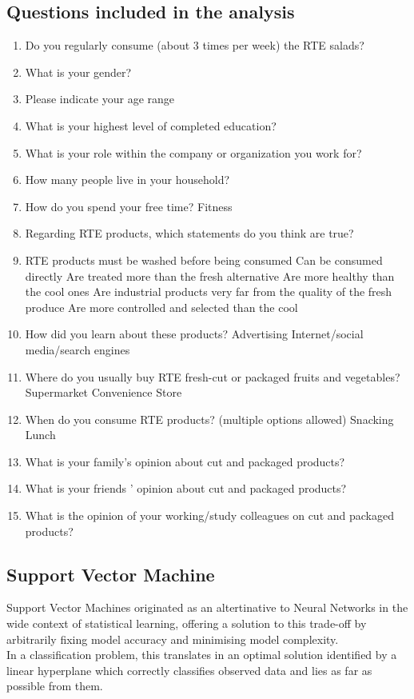 \documentclass[a4,12pt]{article}
\begin{document}
\subsection{Questions included in the analysis}
\label{App.Q}
\begin{enumerate} 
\item	Do you regularly consume (about 3 times per week) the RTE salads? 
\item	What is your gender?
\item	Please indicate your age range
\item	What is your highest level of completed education?
\item	What is your role within the company or organization you work for?
\item	How many people live in your household?
\item	How do you spend your free time? Fitness 
\item	Regarding RTE products, which statements do you think are true?
\item	RTE products must be washed before being consumed
Can be consumed directly
Are treated more than the fresh alternative
Are more healthy than the cool ones
Are industrial products very far from the quality of the fresh produce
Are more controlled and selected than the cool
\item	How did you learn about these products?
Advertising
Internet/social media/search engines
\item	Where do you usually buy RTE fresh-cut or packaged fruits and vegetables?
	Supermarket 
	Convenience Store
\item	When do you consume RTE products? (multiple options allowed)
Snacking 
Lunch 
\item	What is your family's opinion about cut and packaged products?
\item	What is your friends ' opinion about cut and packaged products?
\item	What is the opinion of your working/study colleagues on cut and packaged products?
\end{enumerate}


\subsection{Support Vector Machine}

Support Vector Machines originated as an altertinative to Neural Networks in the wide context of statistical learning, offering a solution to this trade-off by arbitrarily fixing model accuracy and minimising model complexity.\\ 
In a classification problem, this translates in an optimal solution identified by a linear hyperplane which correctly classifies observed data and lies as far as possible from them.\\
\end{document}
